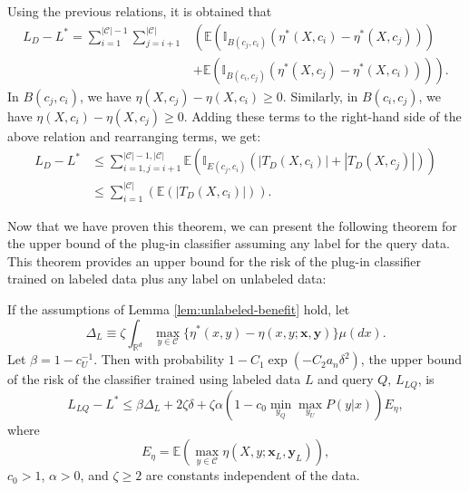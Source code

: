 	Using the previous relations, it is obtained that
	\begin{align}
		L_D - L^* = \sum_{i=1}^{|\mathcal{C}|-1} \sum_{j=i+1}^{|\mathcal{C}|} &\left( \mathbb{E}\left( \mathbb{I}_{B(c_j, c_i)} (\eta^*(X, c_i) - \eta^*(X, c_j)) \right) \right. \\
		&\left. + \mathbb{E}\left( \mathbb{I}_{B(c_i, c_j)} (\eta^*(X, c_j) - \eta^*(X, c_i)) \right) \right).
	\end{align}
	In $B(c_j, c_i)$, we have $\eta(X, c_j) - \eta(X, c_i) \ge 0$. Similarly, in $B(c_i, c_j)$, we have $\eta(X, c_i) - \eta(X, c_j) \ge 0$. Adding these terms to the right-hand side of the above relation and rearranging terms, we get:
	\begin{align}
		L_D - L^* &\le \sum_{i=1, j=i+1}^{|\mathcal{C}|-1, |\mathcal{C}|} \mathbb{E}\left( \mathbb{I}_{E(c_j, c_i)} (|T_D(X, c_i)| + |T_D(X, c_j)|) \right) \\
		&\le \sum_{i=1}^{|\mathcal{C}|} \left( \mathbb{E}(|T_D(X, c_i)|) \right).
	\end{align}
	
	Now that we have proven this theorem, we can present the following theorem for the upper bound of the plug-in classifier assuming any label for the query data. This theorem provides an upper bound for the risk of the plug-in classifier trained on labeled data plus any label on unlabeled data:
	
	\begin{theorem}
		\label{thm:risk-upper-bound}
		If the assumptions of Lemma \ref{lem:unlabeled-benefit} hold, let
		\begin{equation}
			\Delta_L \equiv \zeta \int_{\mathbb{R}^d} \max_{y \in \mathcal{C}} \{\eta^*(x, y) - \eta(x, y; \mathbf{x}, \mathbf{y})\} \mu(dx).
		\end{equation}
		Let $\beta = 1 - c_U^{-1}$. Then with probability $1 - C_1 \exp(-C_2 a_n \delta^2)$, the upper bound of the risk of the classifier trained using labeled data $L$ and query $Q$, $L_{LQ}$, is
		\begin{equation}
			L_{LQ} - L^* \le \beta \Delta_L + 2\zeta \delta + \zeta \alpha \left( 1 - c_0 \min_{y_Q} \max_{y_U} P(y|x) \right) E_\eta,
		\end{equation}
		where
		\begin{equation}
			E_\eta = \mathbb{E}\left( \max_{y \in \mathcal{C}} \eta(X, y; \mathbf{x}_L, \mathbf{y}_L) \right),
		\end{equation}
		$c_0 > 1$, $\alpha > 0$, and $\zeta \ge 2$ are constants independent of the data.
	\end{theorem}
	
